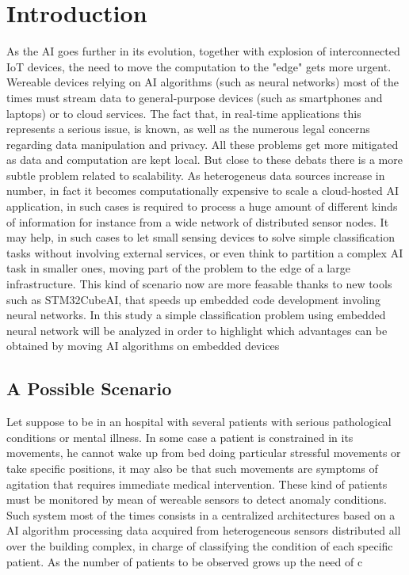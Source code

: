 \section{Introduction}
As the AI goes further in its evolution, together with explosion of interconnected IoT devices, the need to move the computation to the "edge" gets more urgent. Wereable devices relying on AI algorithms (such as neural networks) most of the times must stream data to general-purpose devices (such as smartphones and laptops) or to cloud services. The fact that, in real-time applications this represents a serious issue, is known, as well as the numerous legal concerns regarding data manipulation and privacy. All these problems get more mitigated as data and computation are kept local. But close to these debats there is a more subtle problem related to scalability. As heterogeneus data sources increase in number, in fact it becomes computationally expensive to scale a cloud-hosted AI application, in such cases is required to process a huge amount of different kinds of information for instance from a wide network of distributed sensor nodes. It may help, in such cases to let small sensing devices to solve simple classification tasks without involving external services, or even think to partition a complex AI task in smaller ones, moving part of the problem to the edge of a large infrastructure. This kind of scenario now are more feasable thanks to new tools such as STM32CubeAI, that speeds up embedded code development involing neural networks. In this study a simple classification problem using embedded neural network will be analyzed in order to highlight which advantages can be obtained by moving AI algorithms on embedded devices 

\subsection{A Possible Scenario}
Let suppose to be in an hospital with several patients with serious pathological conditions or mental illness. In some case a patient is constrained in its movements, he cannot wake up from bed doing particular stressful movements or take specific positions, it may also be  that such movements are symptoms of agitation that requires immediate medical intervention. These kind of patients must be monitored by mean of wereable sensors to detect anomaly conditions. Such system most of the times consists in a centralized architectures based on a AI algorithm processing data acquired from heterogeneous sensors distributed all over the building complex, in charge of classifying the condition of each specific patient. As the number of patients to be observed grows up the need of c

